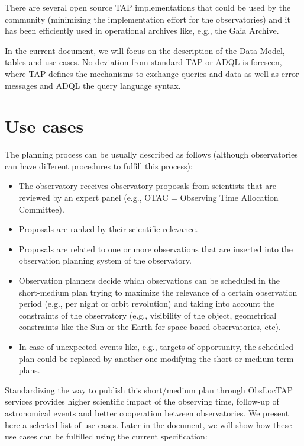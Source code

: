 \documentclass[11pt,a4paper]{ivoa}
\begin{document}
There are several open source TAP implementations that could be used by the
community (minimizing the implementation effort for the observatories) and it
has been efficiently used in operational archives like, e.g., the Gaia Archive.

In the current document, we will focus on
the description of the Data Model, tables
and use cases. No deviation from standard TAP or ADQL is foreseen, where TAP
defines the mechanisms to exchange queries and data as well as error messages
and ADQL the query language syntax.

\section{Use cases}
The planning process can be usually described as follows (although observatories
can have different procedures to fulfill this process):

\begin{itemize}
	\item{The observatory receives observatory proposals from scientists that are
  reviewed by an expert panel (e.g., OTAC = Observing Time Allocation
  Committee).}

	\item{Proposals are ranked by their scientific relevance.}

	\item{Proposals are related to one or more observations that are inserted
  into the observation planning system of the observatory.}

	\item{Observation planners decide which observations can be scheduled in the
  short-medium plan trying to maximize the relevance of a certain observation
  period (e.g., per night or orbit revolution) and taking into account the
  constraints of the observatory (e.g., visibility of the object, geometrical
  constraints like the Sun or the Earth for space-based observatories, etc).}

	\item{In case of unexpected events like, e.g., targets of opportunity, the
  scheduled plan could be replaced by another one modifying the short or
  medium-term plans.}

\end{itemize}

Standardizing the way to publish this short/medium plan through ObsLocTAP
services provides higher scientific impact of the observing time, follow-up of
astronomical events and better cooperation between observatories. We present
here a selected list of use cases. Later in the document, we will show how
these use cases can be fulfilled using the current specification:
\end{document}
